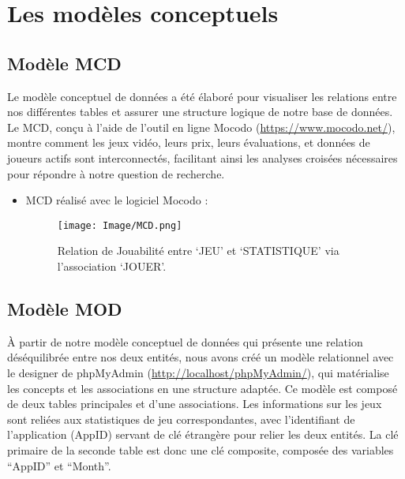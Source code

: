 \documentclass[mstat,12pt]{unswthesis}
\begin{document}
\newpage

\hypertarget{les-moduxe8les-conceptuels}{%
\section{Les modèles conceptuels}\label{les-moduxe8les-conceptuels}}

\hypertarget{moduxe8le-mcd}{%
\subsection{Modèle MCD}\label{moduxe8le-mcd}}

Le modèle conceptuel de données a été élaboré pour visualiser les
relations entre nos différentes tables et assurer une structure logique
de notre base de données. Le MCD, conçu à l'aide de l'outil en ligne
Mocodo (\url{https://www.mocodo.net/}), montre comment les jeux vidéo,
leurs prix, leurs évaluations, et données de joueurs actifs sont
interconnectés, facilitant ainsi les analyses croisées nécessaires pour
répondre à notre question de recherche.

\begin{itemize}
\item
  MCD réalisé avec le logiciel Mocodo :

  \begin{figure}
  \hypertarget{uml}{%
  \centering
  \texttt{[image: Image/MCD.png]}
  \caption{Relation de Jouabilité entre `JEU' et `STATISTIQUE' via
  l'association `JOUER'.}\label{uml}
  }
  \end{figure}
\end{itemize}

\hypertarget{moduxe8le-mod}{%
\subsection{Modèle MOD}\label{moduxe8le-mod}}

À partir de notre modèle conceptuel de données qui présente une relation
déséquilibrée entre nos deux entités, nous avons créé un modèle
relationnel avec le designer de phpMyAdmin
(\url{http://localhost/phpMyAdmin/}), qui matérialise les concepts et
les associations en une structure adaptée. Ce modèle est composé de deux
tables principales et d'une associations. Les informations sur les jeux
sont reliées aux statistiques de jeu correspondantes, avec l'identifiant
de l'application (AppID) servant de clé étrangère pour relier les deux
entités. La clé primaire de la seconde table est donc une clé composite,
composée des variables ``AppID'' et ``Month''.
\end{document}

